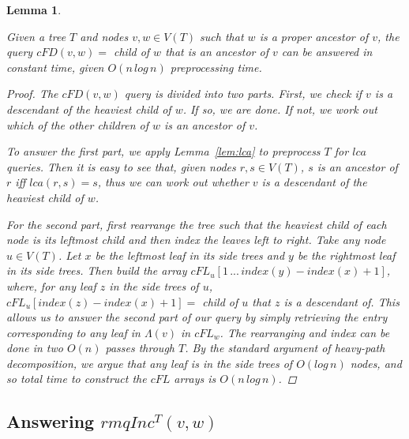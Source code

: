 \documentclass{article}
\newcommand{\leafset}{\Lambda}
\newtheorem{cfd}[incompatibility]{Lemma}
\begin{document}
    \begin{cfd}
        \label{lem:cfd}

        Given a tree $T$ and nodes $v, w \in V(T)$ such that $w$ is a proper ancestor of $v$, the query $cFD(v, w) =$ child of $w$ that is an ancestor of $v$ can be answered in constant time, given $O(n\,log\,n)$ preprocessing time.

        \begin{proof}
                The $cFD(v, w)$ query is divided into two parts. First, we check if $v$ is a descendant of the heaviest child of $w$. If so, we are done. If not, we work out which of the other children of $w$ is an ancestor of $v$.

                To answer the first part, we apply Lemma~\ref{lem:lca} to preprocess $T$ for $lca$ queries. Then it is easy to see that, given nodes $r, s \in V(T)$, $s$ is an ancestor of $r$ iff $lca(r, s) = s$, thus we can work out whether $v$ is a descendant of the heaviest child of $w$.

                For the second part, first rearrange the tree such that the heaviest child of each node is its leftmost child and then index the leaves left to right. Take any node $u \in V(T)$. Let $x$ be the leftmost leaf in its side trees and $y$ be the rightmost leaf in its side trees. Then build the array $cFL_u[1\, ...\, index(y) - index(x) + 1]$, where, for any leaf $z$ in the side trees of $u$, $cFL_u[index(z) - index(x) + 1] = $ child of $u$ that $z$ is a descendant of. This allows us to answer the second part of our query by simply retrieving the entry corresponding to any leaf in $\leafset(v)$ in $cFL_w$. The rearranging and index can be done in two $O(n)$ passes through $T$. By the standard argument of heavy-path decomposition, we argue that any leaf is in the side trees of $O(log\,n)$ nodes, and so total time to construct the $cFL$ arrays is $O(n\,log\,n)$.
        \end{proof}
    \end{cfd}

    \subsection{Answering $rmqInc^T(v, w)$}
\end{document}
